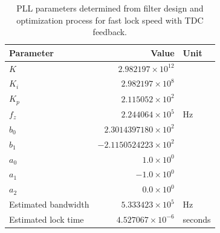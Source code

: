 \begin{table}[h!]
	\centering
	\def\arraystretch{1.5}		
	\setlength\arrayrulewidth{0.75pt}
	\setlength{\tabcolsep}{1em} %
	\begin{tabular}{|l|r|l|}
		\hline 
		\rule[-1ex]{0pt}{2.5ex} \cellcolor{gray!40}\textbf{Parameter} & \cellcolor{gray!40}\textbf{Value} & \cellcolor{gray!40}\textbf{Unit }\\ 
		\hline 
		\rule[-1ex]{0pt}{2.5ex} \textbf{$K$}  & $2.982197\times10^{12}$ &  \\
		\hline 
		\rule[-1ex]{0pt}{2.5ex} \textbf{$K_i$}  & $2.982197\times10^{8}$ &  \\
		\hline 
		\rule[-1ex]{0pt}{2.5ex} \textbf{$K_p$}  & $2.115052\times10^{2}$ &  \\
		\hline 
		\rule[-1ex]{0pt}{2.5ex} \textbf{$f_z$} & $2.244064\times10^5$ & Hz\\
		\hline 
		\rule[-1ex]{0pt}{2.5ex} \textbf{$b_0$}  & $2.3014397180\times10^2$  &\\
		\hline 
		\rule[-1ex]{0pt}{2.5ex} \textbf{$b_1$}  & $-2.1150524223\times10^2$  & \\
		\hline 
		\rule[-1ex]{0pt}{2.5ex} \textbf{$a_0$}  & $1.0\times10^0$  &\\ 
		\hline 
		\rule[-1ex]{0pt}{2.5ex} \textbf{$a_1$}  & $-1.0\times10^0$  & \\
		\hline 
		\rule[-1ex]{0pt}{2.5ex} \textbf{$a_2$}  & $0.0\times10^0$  & \\
		\hline 
		\rule[-1ex]{0pt}{2.5ex} Estimated bandwidth & $5.333423\times10^5$ & Hz \\
		\hline 
		\rule[-1ex]{0pt}{2.5ex} Estimated lock time & $4.527067\times10^{-6}$ & seconds \\
		\hline 
	\end{tabular} 
	\caption{PLL parameters determined from filter design and optimization process for fast lock speed with TDC feedback.}
	\label{filter_params_fast_lock}
\end{table}   

